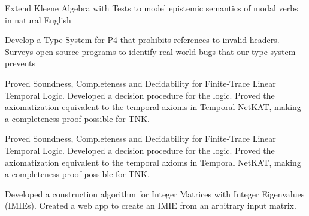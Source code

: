 \documentclass[]{deedy-resume-openfont}
\begin{document}
\begin{minipage}[t]{0.66\textwidth}




Extend Kleene Algebra with Tests to model epistemic semantics of modal verbs in natural English
\sectionsep







Develop a Type System for P4 that prohibits references to invalid headers. Surveys open source programs to identify real-world bugs that our type system prevents
\sectionsep







Proved Soundness, Completeness and Decidability for Finite-Trace Linear Temporal Logic. Developed a decision procedure for the logic. Proved the axiomatization equivalent to the temporal axioms in Temporal NetKAT, making a completeness proof possible for TNK.
\sectionsep







Proved Soundness, Completeness and Decidability for Finite-Trace Linear Temporal Logic. Developed a decision procedure for the logic. Proved the axiomatization equivalent to the temporal axioms in Temporal NetKAT, making a completeness proof possible for TNK.
\sectionsep







Developed a construction algorithm for Integer Matrices with Integer Eigenvalues (IMIEs). Created a web app to create an IMIE from an arbitrary input matrix.
\sectionsep





\end{minipage}
\end{document}
